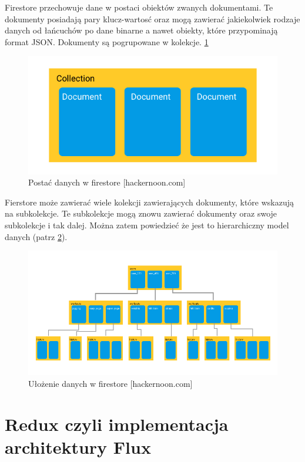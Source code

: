 Firestore przechowuje dane w postaci obiektów zwanych dokumentami.
Te dokumenty posiadają pary klucz-wartosć oraz mogą zawierać jakiekolwiek rodzaje danych
od łańcuchów po dane binarne a nawet obiekty, które przypominają format JSON.
Dokumenty są pogrupowane w kolekcje.
\ref{rys:firestoreData}

\begin{figure}[H]
	\centering\includegraphics[width=.6\textwidth]{img/firestoreData}
	\caption{Postać danych w firestore [hackernoon.com]}\label{rys:firestoreData}%
\end{figure}

Fierstore może zawierać wiele kolekcji zawierających dokumenty, które wskazują na subkolekcje.
Te subkolekcje mogą znowu zawierać dokumenty oraz swoje subkolekcje i tak dalej.
Można zatem powiedzieć że jest to hierarchiczny model danych (patrz \ref{rys:firestoreTree}).
\cite{www_hakermoon}

\begin{figure}[H]
	\centering\includegraphics[width=\textwidth]{img/firestoreTree}
	\caption{Ułożenie danych w firestore [hackernoon.com]}\label{rys:firestoreTree}%
\end{figure}

\section{Redux czyli implementacja architektury Flux}

